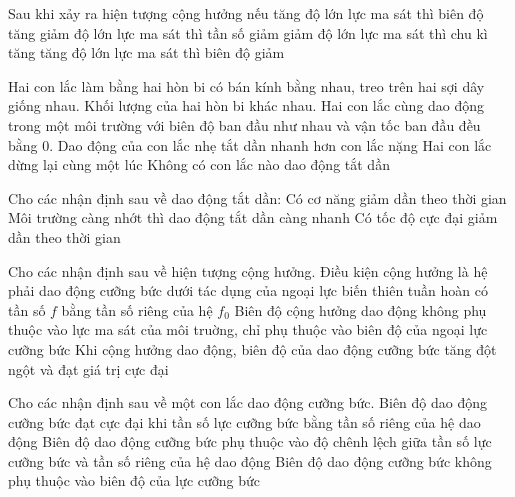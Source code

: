 \begin{ex}%
Sau khi xảy ra hiện tượng cộng hưởng nếu
\choice
{tăng độ lớn lực ma sát thì biên độ tăng}
{giảm độ lớn lực ma sát thì tần số giảm}
{giảm độ lớn lực ma sát thì chu kì tăng}
{\True tăng độ lớn lực ma sát thì biên độ giảm}
\end{ex}  
\begin{ex}%
Hai con lắc làm bằng hai hòn bi có bán kính bằng nhau, treo trên hai sợi dây giống nhau. Khối lượng của hai hòn bi khác nhau. Hai con lắc cùng dao động trong một môi trường với biên độ ban đầu như nhau và vận tốc ban đầu đều bằng 0.
{\True Dao động của con lắc nhẹ tắt dần nhanh hơn con lắc nặng}
{Hai con lắc dừng lại cùng một lúc}
{Không có con lắc nào dao động tắt dần}
\loigiai{
\begin{itemchoice}
\itemch
\itemch
\itemch
\itemch
\end{itemchoice}
}
\end{ex} 
\begin{ex}%
Cho các nhận định sau về dao động tắt dần:
{\True Có cơ năng giảm dần theo thời gian}
{\True Môi trường càng nhớt thì dao động tắt dần càng nhanh}
{\True Có tốc độ cực đại giảm dần theo thời gian}
\loigiai{
\begin{itemchoice}
\itemch
\itemch
\itemch
\itemch
\end{itemchoice}
}
\end{ex} 
\begin{ex}%
Cho các nhận định sau về hiện tượng cộng hưởng.
{\True Điều kiện cộng hưởng là hệ phải dao động cưỡng bức dưới tác dụng của ngoại lực biến thiên tuần hoàn có tần số $f$ bằng tần số riêng của hệ $f_0$}
{Biên độ cộng hưởng dao động không phụ thuộc vào lực ma sát của môi truờng, chỉ phụ thuộc vào biên độ của ngoại lực cưỡng bức}
{\True Khi cộng hưởng dao động, biên độ của dao động cưỡng bức tăng đột ngột và đạt giá trị cực đại}
\loigiai{
\begin{itemchoice}
\itemch
\itemch
\itemch
\itemch
\end{itemchoice}
}
\end{ex} 
\begin{ex}%
Cho các nhận định sau về một con lắc dao động cưỡng bức.
{\True Biên độ dao động cưỡng bức đạt cực đại khi tần số lực cưỡng bức bằng tần số riêng của hệ dao động}
{\True Biên độ dao động cưỡng bức phụ thuộc vào độ chênh lệch giữa tần số lực cưỡng bức và tần số riêng của hệ dao động}
{Biên độ dao động cưỡng bức không phụ thuộc vào biên độ của lực cưỡng bức}
\loigiai{
\begin{itemchoice}
\itemch
\itemch
\itemch
\itemch
\end{itemchoice}
}
\end{ex} 